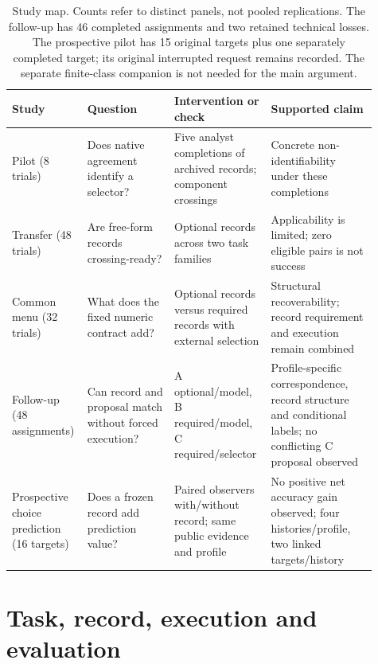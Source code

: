 \begin{table}[htbp]
\centering\small
\begin{tabular}{@{}>{\raggedright\arraybackslash}p{0.14\linewidth}>{\raggedright\arraybackslash}p{0.23\linewidth}>{\raggedright\arraybackslash}p{0.25\linewidth}>{\raggedright\arraybackslash}p{0.29\linewidth}@{}}\toprule
Study & Question & Intervention or check & Supported claim\\\midrule
Pilot (8 trials) & Does native agreement identify a selector? & Five analyst completions of archived records; component crossings & Concrete non-identifiability under these completions\\
Transfer (48 trials) & Are free-form records crossing-ready? & Optional records across two task families & Applicability is limited; zero eligible pairs is not success\\
Common menu (32 trials) & What does the fixed numeric contract add? & Optional records versus required records with external selection & Structural recoverability; record requirement and execution remain combined\\
Follow-up (48 assignments) & Can record and proposal match without forced execution? & A optional/model, B required/model, C required/selector & Profile-specific correspondence, record structure and conditional labels; no conflicting C proposal observed\\
Prospective choice prediction (16 targets) & Does a frozen record add prediction value? & Paired observers with/without record; same public evidence and profile & No positive net accuracy gain observed; four histories/profile, two linked targets/history\\\bottomrule
\end{tabular}
\caption{Study map. Counts refer to distinct panels, not pooled replications.
The follow-up has 46 completed assignments and two retained technical losses.
The prospective pilot has 15 original targets plus one separately completed
target; its original interrupted request remains recorded.
The separate finite-class companion is not needed for the main argument.}
\label{tab:study-map}
\end{table}

\section{Task, record, execution and evaluation}
\label{sec:measurement}
